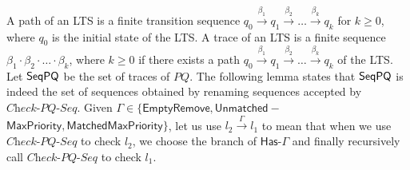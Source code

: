 A path of an LTS is a finite transition sequence $q_0\xrightarrow{\beta_1}q_1\overset{\beta_2}{\longrightarrow}\ldots\overset{\beta_k}{\longrightarrow}q_k$ for $k\geq 0$, where $q_0$ is the initial state of the LTS. A trace of an LTS is a finite sequence $\beta_1 \cdot \beta_2 \cdot \ldots \cdot \beta_k$, where $k \geq 0$ if there exists a path $q_0\overset{\beta_1}{\longrightarrow}q_1\overset{\beta_2}{\longrightarrow}\ldots\overset{\beta_k}{\longrightarrow}q_k$ of the LTS. Let $\mathsf{SeqPQ}$ be the set of traces of $\textit{PQ}$. The following lemma states that $\mathsf{SeqPQ}$ is indeed the set of sequences obtained by renaming sequences accepted by $\textit{Check-PQ-Seq}$. Given $\Gamma\in \{\mathsf{EmptyRemove}, \mathsf{Unmatched-}$ $\mathsf{MaxPriority}, \mathsf{MatchedMaxPriority}\}$, let us use $l_2 \xrightarrow{\Gamma} l_1$ to mean that when we use $\textit{Check-PQ-Seq}$ to check $l_2$, we choose the branch of $\mathsf{Has\text{-}\Gamma}$ and finally recursively call $\textit{Check-PQ-Seq}$ to check $l_1$. 

\EPQRulesAndSemantics*

